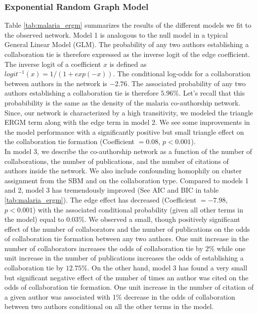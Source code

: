 \subsubsection{Exponential Random Graph Model}
\label{sec:malaria_results_ergm}
Table \ref{tab:malaria_ergm} summarizes the results of the different models we fit to the observed network. Model 1 is analogous to the null model in a typical General Linear Model (GLM). The probability of any two authors establishing a collaboration tie is therefore expressed as the inverse logit of the edge coefficient. The inverse logit of a coefficient $x$ is defined as $logit^{-1}(x)=1/(1+exp(-x))$. The conditional log-odds for a collaboration between authors in the network is $-2.76$. The associated probability of any two authors establishing a collaboration tie is therefore $5.96\%$. Let's recall that this probabibility is the same as the density of the malaria co-authorship network. Since, our network is characterized by a high transitivity, we modeled the triangle ERGM term along with the edge term in model 2. We see some improvements in the model performance with a significantly positive but small triangle effect on the collaboration tie formation (Coefficient $= 0.08$, $p<0.001$). \\
In model 3, we describe the co-authorship network as a function of the number of collaborations, the number of publications, and the number of citations of authors inside the network. We also include confounding homophily on cluster assignment from the SBM and on the collaboration type. Compared to models 1 and 2, model 3 has tremendously improved (See AIC and BIC in table \ref{tab:malaria_ergm}). The edge effect has decreased (Coefficient $=-7.98$, $p<0.001$) with the associated conditional probability (given all other terms in the model) equal to $0.03\%$. We observed a small, though positively significant effect of the number of collaborators and the number of publications on the odds of collaboration tie formation between any two authors. One unit increase in the number of collaborators increases the odds of collaboration tie by $2\%$ while one unit increase in the number of publications increases the odds of establishing a collaboration tie by $12.75\%$. On the other hand, model 3 has found a very small but significant negative effect of the number of times an author was cited on the odds of collaboration tie formation. One unit increase in the number of citation of a given author was associated with 1\% decrease in the odds of collaboration between two authors conditional on all the other terms in the model. \\
